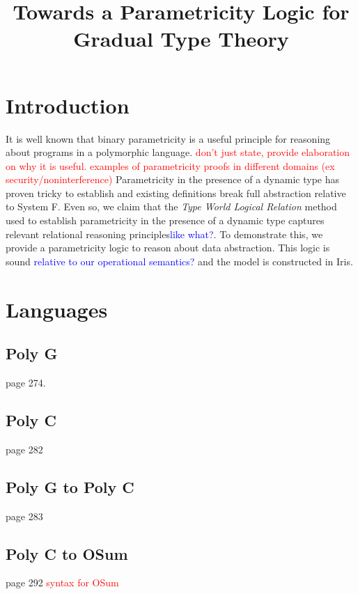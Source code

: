 \documentclass{article}
\newcommand{\blue}[1]{\textcolor{blue}{#1}}
\newcommand{\red}[1]{\textcolor{red}{#1}}
\begin{document}


\title{Towards a Parametricity Logic for Gradual Type Theory}
\maketitle

\section{Introduction}
It is well known that binary parametricity is a useful principle for 
reasoning about programs in a polymorphic language\cite{Reynolds}\cite{wadler_theorems_1989}.
\red{don't just state, provide elaboration on why it is useful. 
examples of parametricity proofs in different domains (ex security/noninterference)}
Parametricity in the presence of a dynamic type has proven tricky to establish 
and existing definitions break full abstraction relative to System F\cite{TwoParamThreeUniv}.
Even so, we claim that the \textit{Type World Logical Relation} method used to establish parametricity 
in the presence of a dynamic type captures relevant relational reasoning principles\blue{like what?}.
To demonstrate this, we provide a parametricity logic\cite{PlotkinAbadi} to reason about data abstraction.
This logic is sound \blue{relative to our operational semantics?} and the model is constructed in Iris. 



\section{Languages}
\subsection{Poly G}
\cite{SemFoundGradType} page 274.

\subsection{Poly C}
\cite{SemFoundGradType} page 282

\subsection{Poly G to Poly C}
\cite{SemFoundGradType} page 283

\subsection{Poly C to OSum}
\cite{SemFoundGradType} page 292
\red{syntax for OSum}
\end{document}
